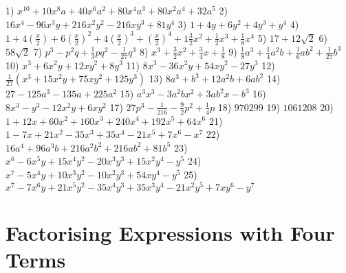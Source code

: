 \documentclass{article}
\begin{document}
{\footnotesize 1) $x^{10}+10x^8a+40x^6a^2+80x^4a^3+80x^2a^4+32a^5$} {\footnotesize 2) $16x^4-96x^3y+216x^2y^2-216xy^3+81y^4$} {\footnotesize 3) $1+4y+6y^2+4y^3+y^4$} {\footnotesize 4) $1+4\left(\frac{x}{2}\right)+6\left(\frac{x}{2}\right)^2+4\left(\frac{x}{2}\right)^3+\left(\frac{x}{2}\right)^4 + 1\frac{3}{2}x^2 + \frac{1}{2}x^3 + \frac{1}{8}x^4$} {\footnotesize 5) $17+12\sqrt{2}$} {\footnotesize 6) $58\sqrt{2}$} {\footnotesize 7) $p^3-p^2q+\frac{1}{3}pq^2-\frac{1}{27}q^3$} {\footnotesize 8) $x^3+\frac{3}{2}x^2+\frac{3}{4}x+\frac{1}{8}$} {\footnotesize 9) $\frac{1}{8}a^3+\frac{1}{4}a^2b+\frac{1}{6}ab^2+\frac{1}{27}b^3$} {\footnotesize 10) $x^3+6x^2y+12xy^2+8y^3$} {\footnotesize 11) $8x^3-36x^2y+54xy^2-27y^3$} {\footnotesize 12) $\frac{1}{27}\left(x^3+15x^2y+75xy^2+125y^3\right)$} {\footnotesize 13) $8a^3+b^3+12a^2b+6ab^2$} {\footnotesize 14) $27-125a^3-135a+225a^2$} {\footnotesize 15) $a^3x^3-3a^2bx^2+3ab^2x-b^3$} {\footnotesize 16) $8x^3-y^3-12x^2y+6xy^2$} {\footnotesize 17) $27p^3-\frac{1}{216}-\frac{9}{2}p^2+\frac{1}{4}p$} {\footnotesize 18) $970299$} {\footnotesize 19) $1061208$} {\footnotesize 20) $1+12x+60x^2+160x^3+240x^4+192x^5+64x^6$} {\footnotesize 21) $1-7x+21x^2-35x^3+35x^4-21x^5+7x^6-x^7$} {\footnotesize 22) $16a^4+96a^3b+216a^2b^2+216ab^2+81b^5$} {\footnotesize 23) $x^6-6x^5y+15x^4y^2-20x^3y^3+15x^2y^4-y^5$} {\footnotesize 24) $x^7-5x^4y+10x^3y^2-10x^2y^3+54xy^4-y^5$} {\footnotesize 25) $x^7-7x^6y+21x^5y^2-35x^4y^3+35x^3y^4-21x^2y^5+7xy^6-y^7$}
\section{Factorising Expressions with Four Terms}
\end{document}
